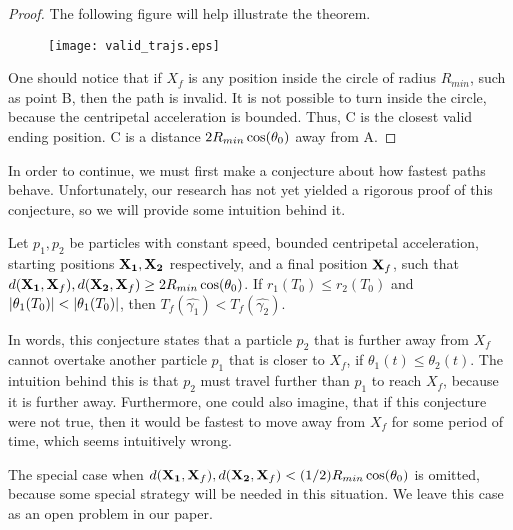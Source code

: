 \begin{proof}

  The following figure will help illustrate the theorem.

  \begin{figure}[H]
    \begin{center}
      \texttt{[image: valid\_trajs.eps]}
    \end{center}
  \vspace{-.2in} %
  \caption{\label{fig:valid-traj}}
  \end{figure}

  One should notice that if $X_f$ is any position inside the circle of radius $R_{min}$, such as point B, then the path is invalid. It is not possible to turn inside the circle, because the centripetal acceleration is bounded. Thus, C is the closest valid ending position. C is a distance $2 R_{min} \cos\paren{\theta_0}$ away from A.

\end{proof}

In order to continue, we must first make a conjecture about how fastest paths behave. Unfortunately, our research has not yet yielded a rigorous proof of this conjecture, so we will provide some intuition behind it.

\begin{conjecture}\label{conj:optimal-position}
  Let $p_1, p_2$ be particles with constant speed, bounded centripetal acceleration, starting positions $\mathbf{X_1}, \mathbf{X_2}$ respectively, and a final position $\mathbf{X}_f$, such that $d(\bvec{X_1}, \bvec{X}_f), d(\bvec{X_2}, \bvec{X}_f) \ge 2 R_{min} \cos\paren{\theta_0}$. If $r_1(T_0) \leq r_2(T_0)$ and $\abs{\theta_1(T_0)} < \abs{\theta_1(T_0)}$, then $T_f(\hat{\gamma_1}) < T_f(\hat{\gamma_2})$.
\end{conjecture}

In words, this conjecture states that a particle $p_2$ that is further away from $X_f$ cannot overtake another particle $p_1$ that is closer to $X_f$, if $\theta_1(t) \le \theta_2(t)$. The intuition behind this is that $p_2$ must travel further than $p_1$ to reach $X_f$, because it is further away. Furthermore, one could also imagine, that if this conjecture were not true, then it would be fastest to move away from $X_f$ for some period of time, which seems intuitively wrong.

The special case when $d(\bvec{X_1}, \bvec{X}_f), d(\bvec{X_2}, \bvec{X}_f) < (1/2) R_{min} \cos\paren{\theta_0}$ is omitted, because some special strategy will be needed in this situation. We leave this case as an open problem in our paper. 

